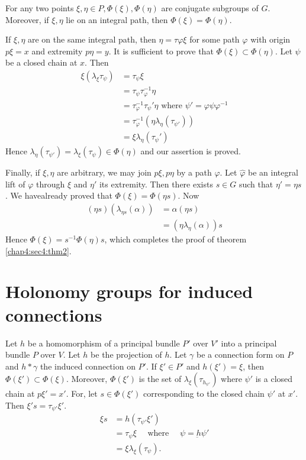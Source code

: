 \begin{theorem}\label{chap4:sec4:thm2}%
\end{theorem}

For any two points $\xi , \eta \in P, \Phi (\xi) , \Phi (\eta)$ are
conjugate subgroups of $G$. Moreover, if $\xi , \eta$ lie on an
integral path, then $\Phi (\xi) = \Phi(\eta)$. 

If $\xi, \eta$ are on the same integral path, then $\eta = \tau
\varphi \xi$ for some path $\varphi$ with origin $p \xi =x$ and
extremity $p \eta= y$. It is sufficient to prove that $\Phi(\xi)
\subset \Phi (\eta)$. Let $\psi$ be a closed chain at $x$. Then 
\begin{align*}
  \xi(\lambda_{\xi} \tau_{\psi}) & = \tau_{\psi} \xi\\
  & = \tau_{\psi} \tau_{\varphi}^{-1} \eta\\
  &= \tau_{\varphi}^{-1} \tau_{\psi}' \eta \text{ where } \psi' =
  \varphi \psi \varphi^{-1}\\ 
  & = \tau_{\varphi}^{-1}( \eta \lambda_{\eta}( \tau_{\psi'}))\\
  & = \xi \lambda_{\eta}(\tau_{\psi}')
\end{align*}
Hence $\lambda_{\eta} (\tau_{\psi'}) = \lambda_{\xi}(\tau_{\psi}) \in
\Phi (\eta)$ and our assertion is proved. 

Finally, if $\xi , \eta$ are arbitrary, we may join $p \xi, p \eta$ by
a path $\varphi$. Let $\hat{\varphi}$ be an integral lift of $\varphi$
through $\xi$ and $\eta'$ its extremity. Then there exists $s \in G$
such that $\eta' = \eta s$. We have\pageoriginale already proved that $\Phi (\xi) =
\Phi (\eta s)$. Now  
\begin{align*}
  (\eta s) (\lambda_{\eta s} (\alpha)) & = \alpha (\eta s)\\
  & = (\eta \lambda_{\eta}(\alpha)) s
\end{align*}
Hence $\Phi(\xi) = s^{-1} \Phi (\eta)s$, which completes the proof of
theorem \ref{chap4:sec4:thm2}. 

\section{Holonomy groups for induced connections}\label{chap4:sec5}%

Let $h$ be a homomorphism of a principal bundle $P'$ over $V'$ into a
principal bundle $P$ over $V$. Let $h$ be the projection of
$h$. Let $\gamma$ be a connection form on $P$ and $h* \gamma$ the induced
connection on $P'$. If $\xi' \in P'$ and $h (\xi') = \xi$, then
$\Phi(\xi') \subset \Phi (\xi)$. 
Moreover, $\Phi (\xi')$ is the set of $\lambda_{\xi}(\tau_{h_{\psi'}})$
where $\psi'$ is a closed chain at $p \xi'=x'$. For, let $s \in
\Phi(\xi')$ corresponding to the closed chain $\psi'$ at $x'$.  Then
$\xi' s = \tau_{\psi '} \xi'$. 
\begin{align*}
  \xi s & = h (\tau_{\psi '} \xi')\\
  &= \tau_{\psi} \xi \quad \text{ where } \quad \psi = \underbar{h} \psi'\\
  &= \xi \lambda_{\xi}(\tau_{\psi}).
\end{align*}

